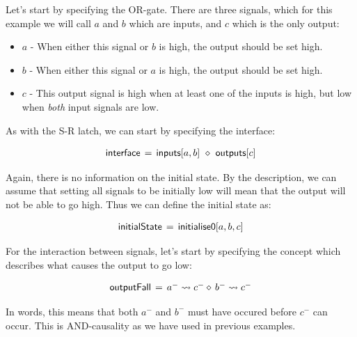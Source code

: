 \documentclass[british,conference,compsoc]{IEEEtran}
\begin{document}
Let's start by specifying the OR-gate. There are three signals, which for this 
example we will call $a$ and $b$ which are inputs, and $c$ which is the only output:

\begin{itemize}
  \item $a$ - When either this signal or $b$ is high, the output should be set high.
  \item $b$ - When either this signal or $a$ is high, the output should be set high.
  \item $c$ - This output signal is high when at least one of the inputs is high, but low when
		\emph{both} input signals are low.
\end{itemize}

As with the S-R latch, we can start by specifying the interface: 


\[
\begin{array}{lcl}
\mathsf{interface}&\hspace{-2mm}=&\hspace{-2mm}\mathsf{inputs}[a, b]~\diamond~\mathsf{outputs}[c]
\end{array}
\]

\noindent Again, there is no information on the initial state. By the description, we can
assume that setting all signals to be initially low will mean that the output
will not be able to go high. Thus we can define the initial state as:


\[
\begin{array}{lcl}
\mathsf{initialState}&\hspace{-2mm}=&\hspace{-2mm}\mathsf{initialise0} [a, b, c]
\end{array}
\]

\noindent For the interaction between signals, let's start by specifying the concept which 
describes what causes the output to go low:

\[
\begin{array}{lcl}
\mathsf{outputFall}&\hspace{-2mm}=&\hspace{-2mm}a^{-} \rightsquigarrow c^{-} \diamond\, b^{-} \rightsquigarrow c^{-}
\end{array}
\]

\noindent In words, this means that both $a^{-}$ and $b^{-}$ must have occured before $c^{-}$ can occur. 
This is AND-causality as we have used in previous examples. 
\end{document}
